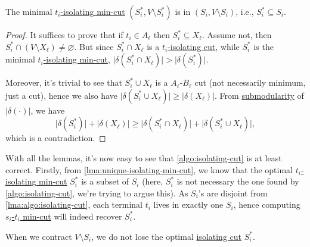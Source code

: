 \begin{lemma}\label{lma:unique-isolating-min-cut}
	The minimal \hyperref[prb:isolating-cut]{\(t_i\)-isolating min-cut} \((S_i^{\ast} , V \setminus S_i^{\ast} )\) is in \((S_i, V\setminus S_i)\), i.e., \(S_i^{\ast} \subseteq S_i\).
\end{lemma}
\begin{proof}
	It suffices to prove that if \(t_i \in A_{\ell } \) then \(S_i^{\ast} \subseteq X_{\ell } \). Assume not, then \(S_i^{\ast} \cap (V\setminus X_{\ell } ) \neq \varnothing \). But since \(S_i^{\ast} \cap X_{\ell } \) is a \hyperref[prb:isolating-cut]{\(t_i\)-isolating cut}, while \(S_i^{\ast} \) is the minimal \hyperref[prb:isolating-cut]{\(t_i\)-isolating min-cut}, \(\lvert \delta (S_i^{\ast} \cap X_{\ell } ) \rvert > \lvert \delta (S_i^{\ast} ) \rvert \).

	Moreover, it's trivial to see that \(S_i^{\ast} \cup X_{\ell } \) is a \(A_{\ell } \)-\(B_{\ell } \) cut (not necessarily minimum, just a cut), hence we also have \(\lvert \delta (S_i^{\ast} \cup X_{\ell } ) \rvert \geq \lvert \delta (X_{\ell } ) \rvert \). From \hyperref[def:submodular]{submodularity} of \(\lvert \delta (\cdot) \rvert \), we have
	\[
		\lvert \delta (S_i^{\ast} ) \rvert + \lvert \delta (X_{\ell } ) \rvert
		\geq \lvert \delta (S_i^{\ast} \cap X_{\ell } ) \rvert + \lvert \delta (S_i^{\ast} \cup X_{\ell } ) \rvert,
	\]
	which is a contradiction.
\end{proof}

With all the lemmas, it's now easy to see that \autoref{algo:isolating-cut} is at least correct. Firstly, from \autoref{lma:unique-isolating-min-cut}, we know that the optimal \hyperref[prb:isolating-cut]{\(t_i\)-isolating min-cut} \(S_i^{\ast} \) is a subset of \(S_i\) (here, \(S_i^{\ast} \) is not necessary the one found by \autoref{algo:isolating-cut}, we're trying to argue this). As \(S_i\)'s are disjoint from \autoref{lma:algo:isolating-cut}, each terminal \(t_i\) lives in exactly one \(S_i\), hence computing \hyperref[prb:s-t-min-cut]{\(s_i\)-\(t_i\) min-cut} will indeed recover \(S_i^{\ast} \).

\begin{intuition}
	When we contract \(V \setminus S_i\), we do not lose the optimal \hyperref[prb:isolating-cut]{isolating cut} \(S_i^{\ast} \).
\end{intuition}

